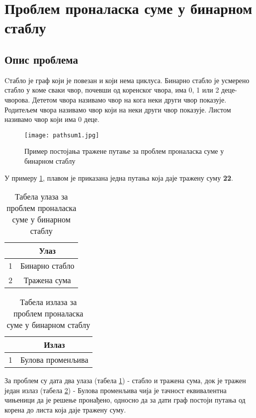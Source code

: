 
\section{Проблем проналаска суме у бинарном стаблу}

\subsection{Опис проблема}
Cтабло је граф који је повезан и који нема циклуса.
Бинарно стабло је усмерено стабло у коме сваки чвор, почевши од коренског чвора, има 0, 1 или 2 деце-чворова. Дететом чвора називамо чвор на кога неки други чвор показује.
Родитељем чвора називамо чвор који на неки други чвор показује. Листом називамо чвор који има 0 деце.

\begin{figure}[H]
    \centering
    \texttt{[image: pathsum1.jpg]}
    \caption{Пример постојања тражене путање за проблем проналаска суме у бинарном стаблу}
    \label{fig:primersume}
\end{figure}

У примеру \ref{fig:primersume}, плавом је приказана једна путања која даје тражену суму \textbf{22}.

\begin{table}[H]
    \centering
    \begin{tabular}{@{}c|c@{}}
        & \textbf{Улаз}           \\
        \hline
    1 & Бинарно стабло \\
    2 & Тражена сума  
    \end{tabular}
    \caption{Табела улаза за проблем проналаска суме у бинарном стаблу}
    \label{table:ulazi}
\end{table}

\begin{table}[H]
    \centering
    \begin{tabular}{@{}c|c@{}}
      & \textbf{Излаз}             \\
      \hline
    1 & Булова променљива
    \end{tabular}
    \caption{Табела излаза за проблем проналаска суме у бинарном стаблу}
    \label{table:izlazi}
\end{table}

За проблем су дата два улаза (табела \ref{table:ulazi}) - стабло и тражена сума, док је тражен један излаз (табела \ref{table:izlazi}) -
Булова променљива чија је тачност еквивалентна чињеници да је решење пронађено, односно да за дати граф постоји путања од корена до листа која даје тражену суму.


